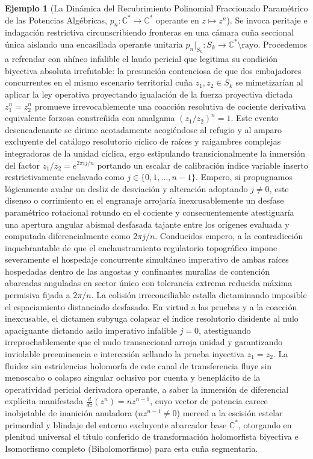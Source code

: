 \documentclass[11pt,a4paper]{article}
\theoremstyle{definition}
\newtheorem{ejemplo}{Ejemplo}[section]
\theoremstyle{remark}
\numberwithin{equation}{section}
\begin{document}
\begin{ejemplo}[La Dinámica del Recubrimiento Polinomial Fraccionado Paramétrico de las Potencias Algébricas, $p_n: \mathbb{C}^* \to \mathbb{C}^*$ operante en $z \mapsto z^n$]
Se invoca peritaje e indagación restrictiva circunscribiendo fronteras en una cámara cuña seccional única aislando una encasillada operante unitaria $p_n|_{S_k} : S_k \to \mathbb{C}^* \setminus \text{rayo}$. Procedemos a refrendar con ahínco infalible el laudo pericial que legitima su condición biyectiva absoluta irrefutable: la presunción contenciosa de que dos embajadores concurrentes en el mismo escenario territorial cuña $z_1, z_2 \in S_k$ se mimetizarían al aplicar la ley operativa proyectando igualación de la fuerza proyectiva dictada $z_1^n = z_2^n$ promueve irrevocablemente una coacción resolutiva de cociente derivativa equivalente forzosa constreñida con amalgama $(z_1/z_2)^n = 1$. Este evento desencadenante se dirime acotadamente acogiéndose al refugio y al amparo excluyente del catálogo resolutorio cíclico de raíces y raigambres complejas integradoras de la unidad cíclica, ergo estipulando transicionalmente la inmersión del factor $z_1/z_2 = e^{2\pi i j / n}$ portando un escalar de calibración índice variable inserto restrictivamente enclavado como  $j \in \{0, 1, \dots, n-1\}$. Empero, si propugnamos lógicamente avalar un desliz de desviación y alteración adoptando $j \neq 0$, este disenso o corrimiento en el engranaje arrojaría inexcusablemente un desfase paramétrico rotacional rotundo en el cociente y consecuentemente atestiguaría una apertura angular abismal desfasada tajante entre los orígenes evaluada y computada diferencialmente como $2\pi j / n$. Conducidos empero, a la contradicción inquebrantable de que el enclaustramiento regulatorio topográfico impone severamente el hospedaje concurrente simultáneo imperativo de ambas raíces hospedadas dentro de las angostas y confinantes murallas de contención abarcadas anguladas en sector único con tolerancia extrema reducida máxima permisiva fijada a $2\pi/n$. La colisión irreconciliable estalla dictaminando imposible el espaciamiento distanciado desfasado. En virtud a las pruebas y a la coacción inexcusable, el dictamen subyuga colapsar el índice resolutorio disidente al nulo apaciguante dictando asilo imperativo infalible $j = 0$, atestiguando irreprochablemente que el nudo transaccional arroja unidad y garantizando inviolable preeminencia e intercesión sellando la prueba inyectiva $z_1 = z_2$.
La fluidez sin estridencias holomorfa de este canal de transferencia fluye sin menoscabo o colapso singular oclusivo por cuenta y beneplácito de la operatividad pericial derivadora operante, a saber la inmersión de diferencial explícita manifestada $\frac{d}{dz}(z^n) = n z^{n-1}$, cuyo vector de potencia carece inobjetable de inanición anuladora ($n z^{n-1} \neq 0$) merced a la escisión estelar primordial y blindaje del entorno excluyente abarcador base $\mathbb{C}^*$, otorgando en plenitud universal el título conferido de transformación holomorfista biyectiva e Isomorfismo completo (Biholomorfismo) para esta cuña segmentaria.


\end{ejemplo}
\end{document}
